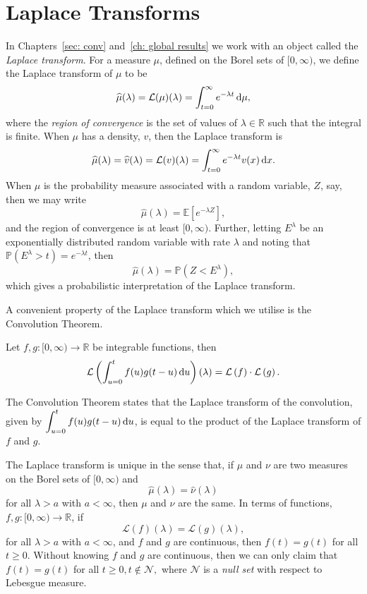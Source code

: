 \section{Laplace Transforms}
In Chapters~\ref{sec: conv} and~\ref{ch: global results} we work with an object called the \emph{Laplace transform}. For a measure \( \mu\), defined on the Borel sets of \([0,\infty)\), we define the Laplace transform of \(\mu\) to be
\[\widehat \mu(\lambda) = \mathcal L(\mu)(\lambda) = \int_{t=0}^\infty e^{-\lambda t}\, \mathrm{d} \mu,\]
where the \emph{region of convergence} is the set of values of \(\lambda\in\mathbb R\) such that the integral is finite. When \(\mu\) has a density, \(v\), then the Laplace transform is 
\[\widehat \mu(\lambda) = \widehat v(\lambda) = \mathcal L(v)(\lambda) = \int_{t=0}^\infty e^{-\lambda t}v(x)\, \mathrm{d} x.\]
When \(\mu\) is the probability measure associated with a random variable, \(Z\), say, then we may write 
\[\widehat \mu(\lambda)=\mathbb E[e^{-\lambda Z}],\]
and the region of convergence is at least \([0,\infty)\). 
Further, letting \(E^\lambda\) be an exponentially distributed random variable with rate \(\lambda\) and noting that \(\mathbb P(E^\lambda >t ) = e^{-\lambda t}\), then 
\[\widehat \mu(\lambda)=\mathbb P(Z<E^\lambda),\]
which gives a probabilistic interpretation of the Laplace transform. 

A convenient property of the Laplace transform which we utilise is the Convolution Theorem. 
\begin{thm}
	Let \(f,g: [0,\infty) \to \mathbb R\) be integrable functions, then 
	\[\mathcal L\left(\int_{u=0}^tf(u)g(t-u)\, \mathrm{d} u\right)(\lambda) = \mathcal L\left(f\right)\cdot \mathcal L\left(g\right).\]
\end{thm}
The Convolution Theorem states that the Laplace transform of the convolution, given by \(\displaystyle \int_{u=0}^tf(u)g(t-u)\, \mathrm{d} u\), is equal to the product of the Laplace transform of \(f\) and \(g\). 

The Laplace transform is unique in the sense that, if \(\mu\) and \(\nu\) are two measures on the Borel sets of \([0,\infty)\) and 
\[\widehat \mu(\lambda) = \widehat \nu(\lambda)\] 
for all \(\lambda > a\) with \(a<\infty\), then \(\mu\) and \(\nu\) are the same. In terms of functions, \(f,g: [0,\infty) \to \mathbb R\), if 
\[\mathcal L(f)(\lambda) = \mathcal L(g)(\lambda),\]
for all \(\lambda > a\) with \(a<\infty\), and \(f\) and \(g\) are continuous, then \(f(t)=g(t)\) for all \(t\geq 0\). Without knowing \(f\) and \(g\) are continuous, then we can only claim that 
\(f(t)=g(t)\) for all \(t\geq 0, t\notin \mathcal N,\) where \(\mathcal N\) is a \emph{null set} with respect to Lebesgue measure. 

